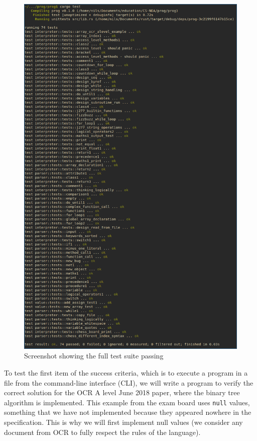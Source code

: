 \documentclass{article}
\begin{document}
\begin{figure}
	\includegraphics[width=\textwidth]{final_test}
	\caption{Screenshot showing the full test suite passing}
	\label{fig:final_test}
\end{figure}

To test the first item of the success criteria, which is to execute a program
in a file from the command-line interface (CLI), we will write a program to
verify the correct solution for the OCR A level June 2018 paper, where the
binary tree algorithm is implemented. This example from the exam board uses
\texttt{null} values, something that we have not implemented because they
appeared nowhere in the specification. This is why we will first implement null
values (we consider any document from OCR to fully respect the rules of the
language).
\end{document}
